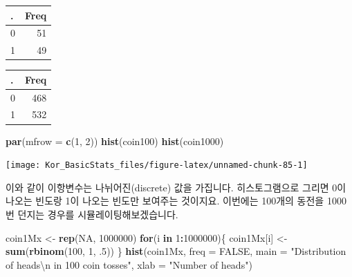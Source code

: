 \documentclass[]{book}
\newenvironment{Shaded}{\begin{snugshade}}{\end{snugshade}}
\newcommand{\CharTok}[1]{\textcolor[rgb]{0.31,0.60,0.02}{#1}}
\newcommand{\CommentTok}[1]{\textcolor[rgb]{0.56,0.35,0.01}{\textit{#1}}}
\newcommand{\ControlFlowTok}[1]{\textcolor[rgb]{0.13,0.29,0.53}{\textbf{#1}}}
\newcommand{\DataTypeTok}[1]{\textcolor[rgb]{0.13,0.29,0.53}{#1}}
\newcommand{\DecValTok}[1]{\textcolor[rgb]{0.00,0.00,0.81}{#1}}
\newcommand{\FloatTok}[1]{\textcolor[rgb]{0.00,0.00,0.81}{#1}}
\newcommand{\KeywordTok}[1]{\textcolor[rgb]{0.13,0.29,0.53}{\textbf{#1}}}
\newcommand{\NormalTok}[1]{#1}
\newcommand{\OperatorTok}[1]{\textcolor[rgb]{0.81,0.36,0.00}{\textbf{#1}}}
\newcommand{\OtherTok}[1]{\textcolor[rgb]{0.56,0.35,0.01}{#1}}
\newcommand{\StringTok}[1]{\textcolor[rgb]{0.31,0.60,0.02}{#1}}
\begin{document}
\begin{tabular}{l|r}
\hline
. & Freq\\
\hline
0 & 51\\
\hline
1 & 49\\
\hline
\end{tabular}

\begin{Shaded}
\end{Shaded}

\begin{tabular}{l|r}
\hline
. & Freq\\
\hline
0 & 468\\
\hline
1 & 532\\
\hline
\end{tabular}

\begin{Shaded}
\begin{Highlighting}[]
\KeywordTok{par}\NormalTok{(}\DataTypeTok{mfrow =} \KeywordTok{c}\NormalTok{(}\DecValTok{1}\NormalTok{, }\DecValTok{2}\NormalTok{))}
\KeywordTok{hist}\NormalTok{(coin100)}
\KeywordTok{hist}\NormalTok{(coin1000)}
\end{Highlighting}
\end{Shaded}

\begin{center}\texttt{[image: Kor\_BasicStats\_files/figure-latex/unnamed-chunk-85-1]} \end{center}

이와 같이 이항변수는 나뉘어진(discrete) 값을 가집니다. 히스토그램으로 그리면 0이 나오는 빈도랑 1이 나오는 빈도만 보여주는 것이지요. 이번에는 100개의 동전을 1000번 던지는 경우를 시뮬레이팅해보겠습니다.

\begin{Shaded}
\begin{Highlighting}[]
\NormalTok{coin1Mx <-}\StringTok{ }\KeywordTok{rep}\NormalTok{(}\OtherTok{NA}\NormalTok{, }\DecValTok{1000000}\NormalTok{)}
\ControlFlowTok{for}\NormalTok{(i }\ControlFlowTok{in} \DecValTok{1}\OperatorTok{:}\DecValTok{1000000}\NormalTok{)\{}
\NormalTok{coin1Mx[i] <-}\StringTok{ }\KeywordTok{sum}\NormalTok{(}\KeywordTok{rbinom}\NormalTok{(}\DecValTok{100}\NormalTok{, }\DecValTok{1}\NormalTok{, }\FloatTok{.5}\NormalTok{))}
\NormalTok{\}}
\KeywordTok{hist}\NormalTok{(coin1Mx, }
     \DataTypeTok{freq =} \OtherTok{FALSE}\NormalTok{, }
     \DataTypeTok{main =} \StringTok{"Distribution of heads}\CharTok{\textbackslash{}n}\StringTok{ in 100 coin tosses"}\NormalTok{, }
     \DataTypeTok{xlab =} \StringTok{"Number of heads"}\NormalTok{)}
\end{Highlighting}
\end{Shaded}
\end{document}
